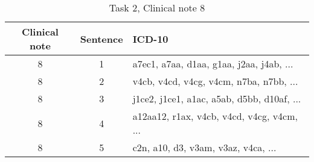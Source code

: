 \begin{table}[htbp] \footnotesize \center
\caption{Task 2, Clinical note 8 \label{tab:t2c8}}
\begin{tabularx}{\textwidth}{c c X}
    \toprule
    Clinical note & Sentence & ICD-10 \\
    \midrule
	 8 & 1 & a7ec1, a7aa, d1aa, g1aa, j2aa, j4ab, ... \\
	 8 & 2 & v4cb, v4cd, v4cg, v4cm, n7ba, n7bb, ... \\
	 8 & 3 & j1ce2, j1ce1, a1ac, a5ab, d5bb, d10af, ... \\
	 8 & 4 & a12aa12, r1ax, v4cb, v4cd, v4cg, v4cm, ... \\
	 8 & 5 & c2n, a10, d3, v3am, v3az, v4ca, ... \\
	\bottomrule
\end{tabularx}
\end{table}



